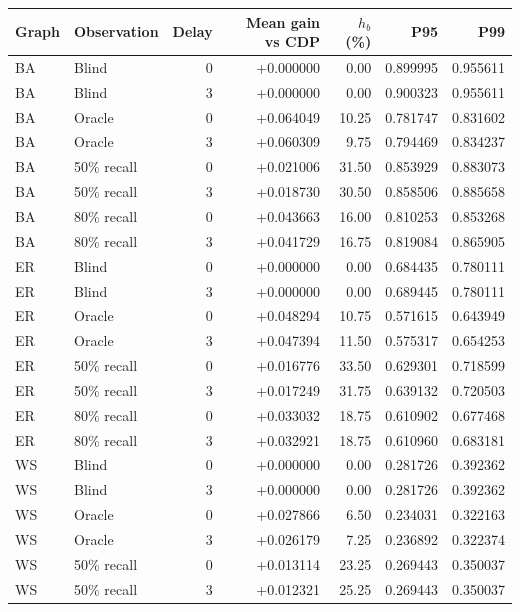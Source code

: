 \documentclass[10pt]{article}
\makeatletter
\newenvironment{exporttable}{\par\noindent\begin{minipage}{\linewidth}\def\@captype{table}}{\end{minipage}\par}
\makeatother
\begin{document}
\begin{exporttable}\centering
\small
\caption{All topology, observation and delay groups of the guarded local policy.}\label{tab:reliability_groups}
\begin{tabularx}{\linewidth}{llrrrrr}\toprule
Graph & Observation & Delay & Mean gain vs CDP & $h_b$ (\%) & P95 & P99\\\midrule
BA & Blind & 0 & +0.000000 & 0.00 & 0.899995 & 0.955611\\
BA & Blind & 3 & +0.000000 & 0.00 & 0.900323 & 0.955611\\
BA & Oracle & 0 & +0.064049 & 10.25 & 0.781747 & 0.831602\\
BA & Oracle & 3 & +0.060309 & 9.75 & 0.794469 & 0.834237\\
BA & 50\% recall & 0 & +0.021006 & 31.50 & 0.853929 & 0.883073\\
BA & 50\% recall & 3 & +0.018730 & 30.50 & 0.858506 & 0.885658\\
BA & 80\% recall & 0 & +0.043663 & 16.00 & 0.810253 & 0.853268\\
BA & 80\% recall & 3 & +0.041729 & 16.75 & 0.819084 & 0.865905\\
ER & Blind & 0 & +0.000000 & 0.00 & 0.684435 & 0.780111\\
ER & Blind & 3 & +0.000000 & 0.00 & 0.689445 & 0.780111\\
ER & Oracle & 0 & +0.048294 & 10.75 & 0.571615 & 0.643949\\
ER & Oracle & 3 & +0.047394 & 11.50 & 0.575317 & 0.654253\\
ER & 50\% recall & 0 & +0.016776 & 33.50 & 0.629301 & 0.718599\\
ER & 50\% recall & 3 & +0.017249 & 31.75 & 0.639132 & 0.720503\\
ER & 80\% recall & 0 & +0.033032 & 18.75 & 0.610902 & 0.677468\\
ER & 80\% recall & 3 & +0.032921 & 18.75 & 0.610960 & 0.683181\\
WS & Blind & 0 & +0.000000 & 0.00 & 0.281726 & 0.392362\\
WS & Blind & 3 & +0.000000 & 0.00 & 0.281726 & 0.392362\\
WS & Oracle & 0 & +0.027866 & 6.50 & 0.234031 & 0.322163\\
WS & Oracle & 3 & +0.026179 & 7.25 & 0.236892 & 0.322374\\
WS & 50\% recall & 0 & +0.013114 & 23.25 & 0.269443 & 0.350037\\
WS & 50\% recall & 3 & +0.012321 & 25.25 & 0.269443 & 0.350037\\

\end{tabularx}
\end{exporttable}
\end{document}
